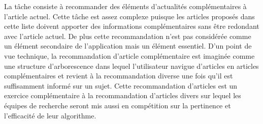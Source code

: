 La tâche consiste à recommander des éléments d'actualités complémentaires à l'article actuel. Cette tâche est assez complexe puisque les articles proposés dans cette liste doivent apporter des informations complémentaires sans être redondant avec l'article actuel. De plus cette recommandation n'est pas considérée comme un élément secondaire de l'application mais un élément essentiel. D'un point de vue technique, la recommandation d'article complémentaire est imaginée comme une structure d'arborescence dans lequel l'utilisateur navigue d'articles en articles complémentaires et revient à la recommandation diverse une fois qu'il est suffisamment informé sur un sujet. Cette recommandation d'articles est un exercice complémentaire à la recommandation d'articles divers sur lequel les équipes de recherche seront mis aussi en compétition sur la pertinence et l'efficacité de leur algorithme.


